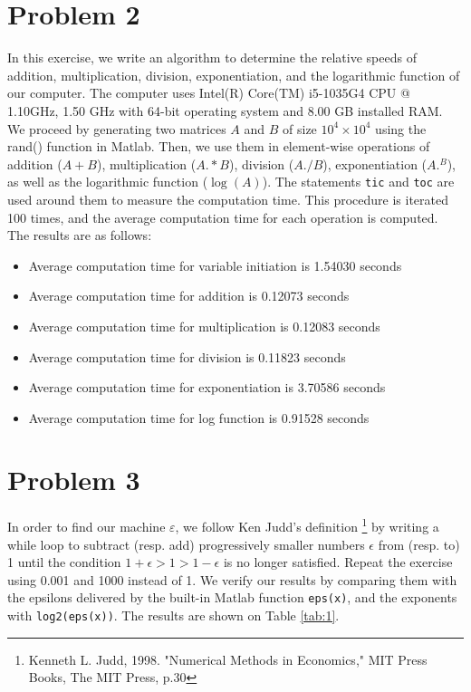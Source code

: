 \documentclass[11pt]{article}
\newcommand{\1}{\mathbbm{1}}
\newcounter{daggerfootnote}
\newcommand*{\daggerfootnote}[1]{%
	\setcounter{daggerfootnote}{\value{footnote}}%
	\renewcommand*{\thefootnote}{\fnsymbol{footnote}}%
	\footnote[2]{#1}%
	\setcounter{footnote}{\value{daggerfootnote}}%
	\renewcommand*{\thefootnote}{\arabic{footnote}}%
}
\begin{document}
\section*{Problem 2}
In this exercise, we write an algorithm to determine the relative speeds of addition, multiplication, division, exponentiation, and the logarithmic function of our computer. The computer uses Intel(R) Core(TM) i5-1035G4 CPU @ 1.10GHz, 1.50 GHz with 64-bit operating system and 8.00 GB installed RAM. We proceed by generating two matrices $A$ and $B$ of size $10^4\times10^4$ using the rand() function in Matlab. Then, we use them in element-wise operations of addition ($A+B$), multiplication ($A.*B$), division ($A./B$), exponentiation ($A.^B$), as well as the logarithmic function ($\log(A)$). The statements \texttt{tic} and \texttt{toc} are used around them to measure the computation time. This procedure is iterated 100 times, and the average computation time for each operation is computed. The results are as follows:
	\begin{itemize}
	\item Average computation time for variable initiation is 1.54030 seconds
	\item Average computation time for addition is 0.12073 seconds
	\item Average computation time for multiplication is 0.12083 seconds
	\item Average computation time for division is 0.11823 seconds
	\item Average computation time for exponentiation is 3.70586 seconds
	\item Average computation time for log function is 0.91528 seconds
	\end{itemize}
\section*{Problem 3}
	In order to find our machine $\varepsilon$, we follow Ken Judd's definition\daggerfootnote{Kenneth L. Judd, 1998. "Numerical Methods in Economics," MIT Press Books, The MIT Press, p.30} by writing a while loop to subtract (resp. add) progressively smaller numbers $\epsilon$ from (resp. to) 1 until the condition $1+\epsilon > 1 > 1-\epsilon$ is no longer satisfied. Repeat the exercise using 0.001 and 1000 instead of 1. We verify our results by comparing them with the epsilons delivered by the built-in Matlab function \texttt{eps(x)}, and the exponents with \texttt{log2(eps(x))}. The results are shown on Table \ref{tab:1}.
	
\end{document}
